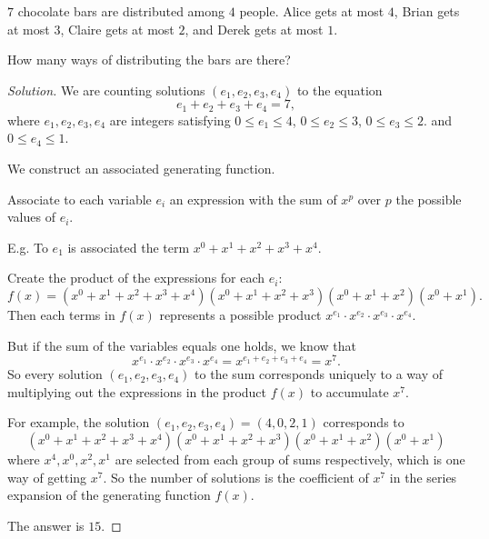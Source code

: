 \documentclass[10pt, a4paper]{article}
\begin{document}
\begin{example}
    $7$ chocolate bars are distributed among $4$ people.
    Alice gets at most $4$,
    Brian gets at most $3$,
    Claire gets at most $2$,
    and Derek gets at most $1$.

    How many ways of distributing the bars are there?
    \begin{proof}[Solution]\renewcommand{\qedsymbol}{}
        We are counting solutions $(e_1, e_2, e_3, e_4)$ to the equation
        \[
        e_1 + e_2 + e_3 + e_4 = 7,
        \]
        where $e_1, e_2, e_3, e_4$ are integers satisfying $0 \leq e_1 \leq 4$, $0 \leq e_2 \leq 3$, $0 \leq e_3 \leq 2$.
        and $0 \leq e_4 \leq 1$.
        
        We construct an associated generating function.

        Associate to each variable $e_i$ an expression with the sum of $x ^ p$ over $p$ the possible values of $e_i$.

        E.g. To $e_1$ is associated the term $x ^ 0 + x ^ 1 + x ^ 2 + x ^ 3 + x ^ 4$.

        Create the product of the expressions for each $e_i$:
        \[
        f(x) = (x ^ 0 + x ^ 1 + x ^ 2 + x ^ 3 + x ^ 4)(x ^ 0 + x ^ 1 + x ^ 2 + x ^ 3)(x ^ 0 + x ^ 1 + x ^ 2)(x ^ 0 + x ^ 1).
        \]
        Then each terms in $f(x)$ represents a possible product $x ^ {e_1} \cdot x ^ {e_2} \cdot x ^ {e_3} \cdot x ^ {e_4}$.
        
        But if the sum of the variables equals one holds,
        we know that
        \[
        x ^ {e_1} \cdot x ^ {e_2} \cdot x ^ {e_3} \cdot x ^ {e_4} = x ^ {e_1 + e_2 + e_3 + e_4} = x ^ 7.
        \]
        So every solution $(e_1, e_2, e_3, e_4)$ to the sum corresponds uniquely to a way of multiplying out the expressions in the product $f(x)$ to accumulate $x ^ 7$.

        For example,
        the solution $(e_1, e_2, e_3, e_4) = (4, 0, 2, 1)$ corresponds to
        \[
        (x ^ 0 + x ^ 1 + x ^ 2 + x ^ 3 + x ^ 4)(x ^ 0 + x ^ 1 + x ^ 2 + x ^ 3)(x ^ 0 + x ^ 1 + x ^ 2)(x ^ 0 + x ^ 1)
        \]
        where $x ^ 4, x ^ 0, x ^ 2, x ^ 1$ are selected from each group of sums respectively,
        which is one way of getting $x ^ 7$.
        So the number of solutions is the coefficient of $x ^ 7$ in the series expansion of the generating function $f(x)$.

        The answer is $15$.
    \end{proof}
\end{example}
\end{document}
